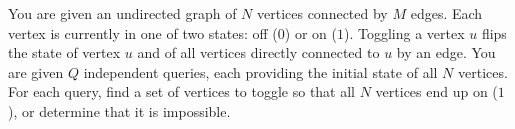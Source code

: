 You are given an undirected graph of $N$ vertices connected by $M$ edges. Each vertex is currently in one of two states: off ($0$) or on ($1$). Toggling a vertex $u$ flips the state of vertex $u$ and of all vertices directly connected to $u$ by an edge. You are given $Q$ independent queries, each providing the initial state of all $N$ vertices. For each query, find a set of vertices to toggle so that all $N$ vertices end up on ($1$), or determine that it is impossible.
